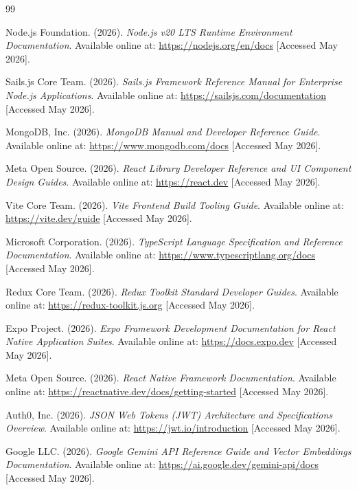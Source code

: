 \documentclass[12pt,a4paper]{report}
\begin{document}
\renewcommand{\bibname}{Webography}
\begin{thebibliography}{99}
\raggedright
{}

Node.js Foundation. (2026). \textit{Node.js v20 LTS Runtime Environment Documentation}. Available online at: \url{https://nodejs.org/en/docs} [Accessed May 2026].

Sails.js Core Team. (2026). \textit{Sails.js Framework Reference Manual for Enterprise Node.js Applications}. Available online at: \url{https://sailsjs.com/documentation} [Accessed May 2026].

MongoDB, Inc. (2026). \textit{MongoDB Manual and Developer Reference Guide}. Available online at: \url{https://www.mongodb.com/docs} [Accessed May 2026].

Meta Open Source. (2026). \textit{React Library Developer Reference and UI Component Design Guides}. Available online at: \url{https://react.dev} [Accessed May 2026].

Vite Core Team. (2026). \textit{Vite Frontend Build Tooling Guide}. Available online at: \url{https://vite.dev/guide} [Accessed May 2026].

Microsoft Corporation. (2026). \textit{TypeScript Language Specification and Reference Documentation}. Available online at: \url{https://www.typescriptlang.org/docs} [Accessed May 2026].

Redux Core Team. (2026). \textit{Redux Toolkit Standard Developer Guides}. Available online at: \url{https://redux-toolkit.js.org} [Accessed May 2026].

Expo Project. (2026). \textit{Expo Framework Development Documentation for React Native Application Suites}. Available online at: \url{https://docs.expo.dev} [Accessed May 2026].

Meta Open Source. (2026). \textit{React Native Framework Documentation}. Available online at: \url{https://reactnative.dev/docs/getting-started} [Accessed May 2026].

Auth0, Inc. (2026). \textit{JSON Web Tokens (JWT) Architecture and Specifications Overview}. Available online at: \url{https://jwt.io/introduction} [Accessed May 2026].

Google LLC. (2026). \textit{Google Gemini API Reference Guide and Vector Embeddings Documentation}. Available online at: \url{https://ai.google.dev/gemini-api/docs} [Accessed May 2026].


\end{thebibliography}
\end{document}
